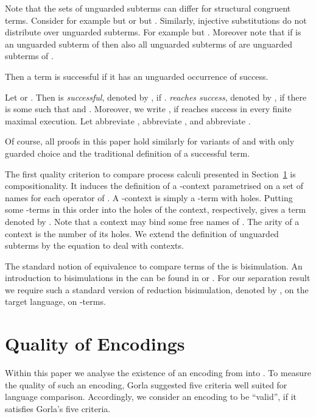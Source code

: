 \documentclass[final,copyright,creativecommons]{eptcs}
\begin{document}
\noindent
Note that the sets of unguarded subterms can differ for structural congruent terms. Consider for example  but 
or  but .
Similarly, injective substitutions do not distribute over unguarded subterms.
For example  but .
Moreover note that if  is an unguarded subterm of  then also all unguarded subterms of  are unguarded subterms of .

Then a term is successful if it has an unguarded occurrence of success.

\begin{definition}
	Let  or . Then  is \emph{successful}, denoted by , if .
	\emph{ reaches success}, denoted by , if there is some  such that  and .
	Moreover, we write , if  reaches success in every finite maximal execution.
Let  abbreviate ,  abbreviate , and  abbreviate .
\end{definition}

\noindent
Of course, all proofs in this paper hold similarly for variants of \piT and \piNM with only guarded choice and the traditional definition of a successful term.

The first quality criterion to compare process calculi presented in Section~\ref{sec:quality} is compositionality. It induces the definition of a \piNM-context parametrised on a set of names for each operator of \piT. A \piNM-context  is simply a \piNM-term with  holes. Putting some \piNM-terms  in this order into the holes  of the context, respectively, gives a term denoted by . Note that a context may bind some free names of . The arity of a context is the number of its holes. We extend the definition of unguarded subterms by the equation  to deal with contexts.

The standard notion of equivalence to compare terms of the \piCal is bisimulation. An introduction to bisimulations in the \piCal can be found \eg in \cite{milnerParrowWalker92} or \cite{sang}. For our separation result we require such a standard version of reduction bisimulation, denoted by , on the target language, \ie on \piNM-terms.



\section{Quality of Encodings}
\label{sec:quality}

Within this paper we analyse the existence of an encoding from \piT into \piNM. To measure the quality of such an encoding, Gorla \cite{gorla} suggested five criteria well suited for language comparison. Accordingly, we consider an encoding to be ``valid'', if it satisfies Gorla's five criteria.
\end{document}
